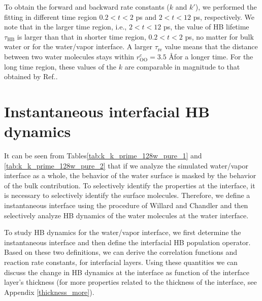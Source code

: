 To obtain the forward and backward rate constants ($k$ and $k'$),
we performed the fitting in different time region $0.2 < t < 2$ ps and $2 < t < 12$ ps, respectively.
We note that in the larger time region, i.e., $2 < t < 12$ ps, the value of HB lifetime $\tau_\text{HB}$ is larger than that in shorter time region, $0.2 < t < 2$ ps,
no matter for bulk water or for the water/vapor interface. A larger $\tau_\text{re}$ value means that the distance between two water molecules 
stays within $r_\text{OO}^c= 3.5$ \AA for a longer time. 
For the long time region, these values of the $k$ are comparable in magnitude to that obtained by Ref.. 


\section{Instantaneous interfacial HB dynamics}\label{PARA_IHB}
It can be seen from Tables\thinspace\ref{tab:k_k_prime_128w_pure_1} and \ref{tab:k_k_prime_128w_pure_2} that 
if we analyze the simulated water/vapor interface as a whole, the behavior of the water surface is masked by the behavior of the bulk contribution.
To selectively identify the properties at the interface, it is necessary to selectively identify the surface molecules.
Therefore, we define a instantaneous interface using the procedure of Willard and Chandler\cite{Willard2010} and then selectively analyze HB dynamics of the water molecules
at the water interface.

To study HB dynamics for the water/vapor interface, we first determine the instantaneous interface and then define the interfacial HB population operator. 
Based on these two definitions, we can derive the correlation functions and reaction rate constants, for interfacial layers. 
Using these quantities we can discuss the change in HB dynamics at the interface as function of the interface layer's thickness 
(for more properties related to the thickness of the interface, see Appendix \ref{thickness_more}).


